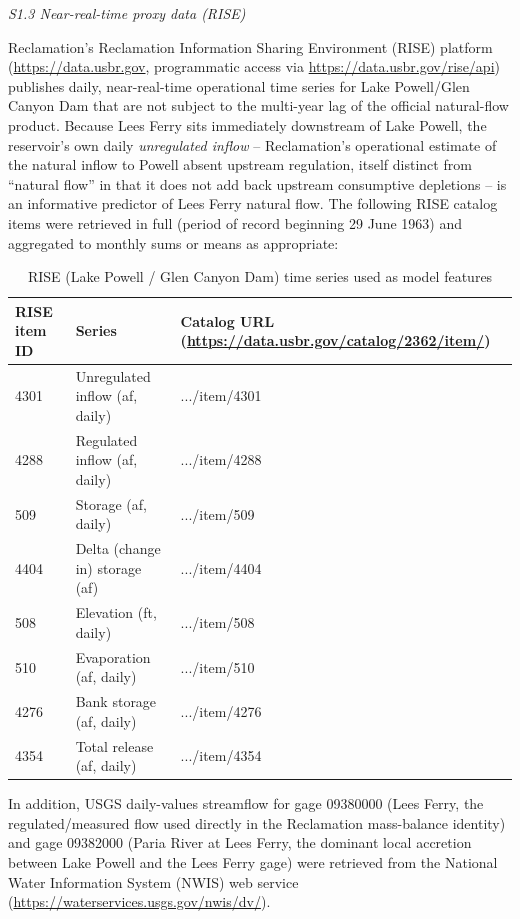 \documentclass[draft,grl]{agutexSI2019}
\begin{document}
\begin{article}
\noindent\textit{S1.3 Near-real-time proxy data (RISE)}

Reclamation's Reclamation Information Sharing Environment (RISE) platform \cite{usbr_rise2026} (\url{https://data.usbr.gov}, programmatic access via \url{https://data.usbr.gov/rise/api}) publishes daily, near-real-time operational time series for Lake Powell/Glen Canyon Dam that are not subject to the multi-year lag of the official natural-flow product. Because Lees Ferry sits immediately downstream of Lake Powell, the reservoir's own daily \emph{unregulated inflow} -- Reclamation's operational estimate of the natural inflow to Powell absent upstream regulation, itself distinct from ``natural flow'' in that it does not add back upstream consumptive depletions -- is an informative predictor of Lees Ferry natural flow. The following RISE catalog items were retrieved in full (period of record beginning 29 June 1963) and aggregated to monthly sums or means as appropriate:

\begin{table}
\caption{RISE (Lake Powell / Glen Canyon Dam) time series used as model features}
\centering
\begin{tabular}{l l l}
\hline
RISE item ID & Series & Catalog URL (\url{https://data.usbr.gov/catalog/2362/item/}) \\
\hline
4301 & Unregulated inflow (af, daily) & .../item/4301 \\
4288 & Regulated inflow (af, daily)   & .../item/4288 \\
509  & Storage (af, daily)            & .../item/509  \\
4404 & Delta (change in) storage (af) & .../item/4404 \\
508  & Elevation (ft, daily)          & .../item/508  \\
510  & Evaporation (af, daily)        & .../item/510  \\
4276 & Bank storage (af, daily)       & .../item/4276 \\
4354 & Total release (af, daily)      & .../item/4354 \\
\hline
\end{tabular}
\end{table}

In addition, USGS daily-values streamflow for gage 09380000 (Lees Ferry, the regulated/measured flow used directly in the Reclamation mass-balance identity) and gage 09382000 (Paria River at Lees Ferry, the dominant local accretion between Lake Powell and the Lees Ferry gage) were retrieved from the National Water Information System (NWIS) web service \cite{usgs_nwis} (\url{https://waterservices.usgs.gov/nwis/dv/}).


\end{article}
\end{document}
